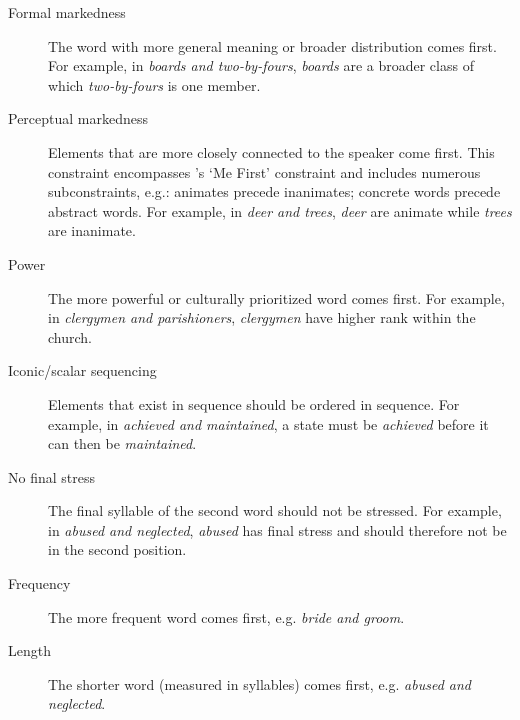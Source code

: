 \documentclass[authoryear]{elsarticle}
\begin{document}
\begin{description}
  \item[Formal markedness] The word with more general meaning or broader distribution comes first. For example, in \emph{boards and two-by-fours}, \emph{boards} are a broader class of which \emph{two-by-fours} is one member.
  \item[Perceptual markedness] Elements that are more closely connected to the speaker come first. This constraint encompasses \citeauthor{Cooper:1975uz}'s \citeyearpar{Cooper:1975uz} `Me First' constraint and includes numerous subconstraints, e.g.: animates precede inanimates; concrete words precede abstract words. For example, in \emph{deer and trees}, \emph{deer} are animate while \emph{trees} are inanimate.
  \item[Power] The more powerful or culturally prioritized word comes first. For example, in \emph{clergymen and parishioners}, \emph{clergymen} have higher rank within the church.
  \item[Iconic/scalar sequencing] Elements that exist in sequence should be ordered in sequence. For example, in \emph{achieved and maintained}, a state must be \emph{achieved} before it can then be \emph{maintained}.
  \item[No final stress] The final syllable of the second word should not be stressed. For example, in \emph{abused and neglected}, \emph{abused} has final stress and should therefore not be in the second position.
  \item[Frequency] The more frequent word comes first, e.g. \emph{bride and groom}.
  \item[Length] The shorter word (measured in syllables) comes first, e.g. \emph{abused and neglected}.
  
\end{description}
\end{document}
